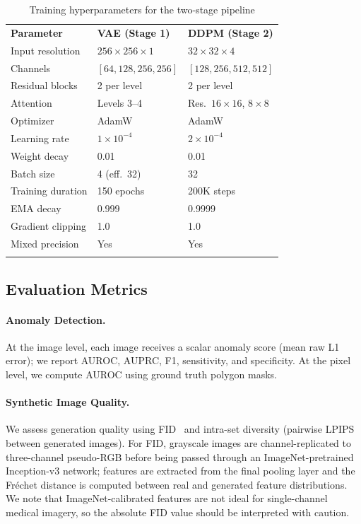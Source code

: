 \documentclass[graybox]{svmult}
\begin{document}
\begin{table}[!t]
\caption{Training hyperparameters for the two-stage pipeline}
\label{tab:hyperparameters}
\begin{tabular}{p{3.5cm}p{3.5cm}p{3.5cm}}
\hline\noalign{\smallskip}
\textbf{Parameter} & \textbf{VAE (Stage 1)} & \textbf{DDPM (Stage 2)} \\
\noalign{\smallskip}\svhline\noalign{\smallskip}
Input resolution    & $256 \times 256 \times 1$ & $32 \times 32 \times 4$ \\
Channels            & $[64, 128, 256, 256]$ & $[128, 256, 512, 512]$ \\
Residual blocks     & 2 per level & 2 per level \\
Attention           & Levels 3--4 & Res.\ $16 \times 16$, $8 \times 8$ \\
Optimizer           & AdamW & AdamW \\
Learning rate       & $1 \times 10^{-4}$ & $2 \times 10^{-4}$ \\
Weight decay        & 0.01 & 0.01 \\
Batch size          & 4 (eff.\ 32) & 32 \\
Training duration   & 150 epochs & 200K steps \\
EMA decay           & 0.999 & 0.9999 \\
Gradient clipping   & 1.0 & 1.0 \\
Mixed precision     & Yes & Yes \\
\noalign{\smallskip}\hline\noalign{\smallskip}
\end{tabular}
\end{table}

\subsection{Evaluation Metrics}
\label{sec:metrics}

\paragraph{Anomaly Detection.} At the image level, each image receives a scalar anomaly score (mean raw L1 error); we report AUROC, AUPRC, F1, sensitivity, and specificity. At the pixel level, we compute AUROC using ground truth polygon masks.

\paragraph{Synthetic Image Quality.} We assess generation quality using FID~\cite{heusel2017gans} and intra-set diversity (pairwise LPIPS~\cite{zhang2018perceptual} between generated images). For FID, grayscale images are channel-replicated to three-channel pseudo-RGB before being passed through an ImageNet-pretrained Inception-v3 network; features are extracted from the final pooling layer and the Fr\'echet distance is computed between real and generated feature distributions. We note that ImageNet-calibrated features are not ideal for single-channel medical imagery, so the absolute FID value should be interpreted with caution.
\end{document}
